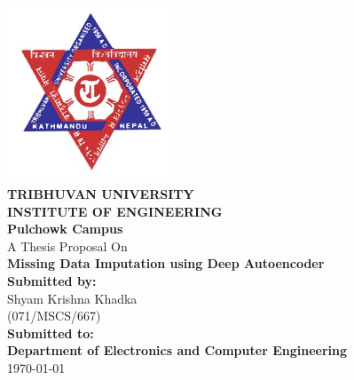 %
%
%
%
%
\begin{titlepage}
  \addtolength{\hoffset}{0.5\evensidemargin-0.5\oddsidemargin} %
  \noindent%
  
  \begin{center}
  	\includegraphics[width=50mm]{figures/tu.jpg}\\
  
\textsc{\LARGE \bfseries TRIBHUVAN UNIVERSITY}\\[0.5cm] %
\textsc{\large \bfseries INSTITUTE OF ENGINEERING}\\
\large \textbf{ Pulchowk Campus } \\[0.7cm]
\vspace{2cm}
A Thesis Proposal On \\[0.2cm]
\Large \textbf{Missing Data Imputation using Deep Autoencoder}\\[0.5cm]
\vspace{2.2cm}
\textbf{Submitted by:}\\
\large{ Shyam Krishna Khadka   \\
(071/MSCS/667) }\\
\vspace{2.2cm}
\textbf{Submitted to:}\\
\textbf{Department of Electronics and Computer Engineering}
\\[0.4cm]
\vspace{0.5cm}
{\large \today}
\end{center}
\end{titlepage}
\clearpage
